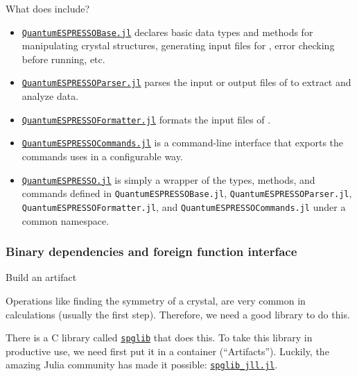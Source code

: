 \begin{frame}[allowframebreaks]{What does \express{} include?}
\begin{itemize}
              provides a standard API for some popular \ab{} software such as \qe.
        \item \href{https://github.com/MineralsCloud/QuantumESPRESSOBase.jl}{\texttt{Quantum\-ESPRESSO\-Base.jl}}
              declares basic data types and methods
              for manipulating crystal structures, generating input files for \qe,
              error checking before running, etc.
        \item \href{https://github.com/MineralsCloud/QuantumESPRESSOParser.jl}{\texttt{Quantum\-ESPRESSO\-Parser.jl}}
              parses the input or output files of \qe{} to extract and analyze data.
        \item \href{https://github.com/MineralsCloud/QuantumESPRESSOFormatter.jl}{\texttt{Quantum\-ESPRESSO\-Formatter.jl}}
              formats the input files of \qe.
        \item \href{https://github.com/MineralsCloud/QuantumESPRESSOCommands.jl}{\texttt{Quantum\-ESPRESSO\-Commands.jl}}
              is a command-line interface that exports the commands \qe{} uses in a configurable way.
        \item \href{https://github.com/MineralsCloud/QuantumESPRESSO.jl}{\texttt{QuantumESPRESSO.jl}}
              is simply a wrapper of the types, methods, and commands defined in
              \texttt{Quantum\-ESPRESSO\-Base.jl}, \texttt{Quantum\-ESPRESSO\-Parser.jl},
              \texttt{Quantum\-ESPRESSO\-Formatter.jl},
              and \texttt{Quantum\-ESPRESSO\-Commands.jl} under a common namespace.
    \end{itemize}

\end{frame}

\subsubsection{Binary dependencies and foreign function interface}

\begin{frame}{Build an artifact}

    Operations like finding the symmetry of a crystal,
    are very common in \ab{} calculations (usually the first step).
    Therefore, we need a good library to do this.

    There is a C library called \href{https://github.com/spglib/spglib}{\texttt{spglib}}
    that does this.
    To take this library in productive use, we need first put it in a container
    (``Artifacts''). Luckily, the amazing Julia community has made it possible:
    \href{https://github.com/JuliaBinaryWrappers/spglib_jll.jl}{\texttt{spglib_jll.jl}}.

\end{frame}

